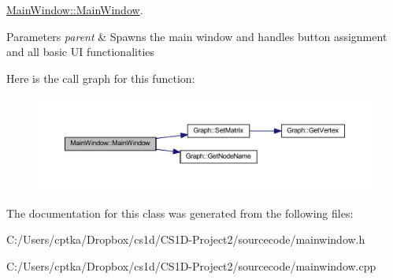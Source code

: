 \mbox{\hyperlink{class_main_window_a8b244be8b7b7db1b08de2a2acb9409db}{Main\+Window\+::\+Main\+Window}}. 


\begin{DoxyParams}{Parameters}
{\em parent} & Spawns the main window and handles button assignment and all basic UI functionalities \\
\hline
\end{DoxyParams}
Here is the call graph for this function\+:
\nopagebreak
\begin{figure}[H]
\begin{center}
\leavevmode
\includegraphics[width=350pt]{class_main_window_a8b244be8b7b7db1b08de2a2acb9409db_cgraph}
\end{center}
\end{figure}


The documentation for this class was generated from the following files\+:\begin{DoxyCompactItemize}
\item 
C\+:/\+Users/cptka/\+Dropbox/cs1d/\+C\+S1\+D-\/\+Project2/sourcecode/mainwindow.\+h\item 
C\+:/\+Users/cptka/\+Dropbox/cs1d/\+C\+S1\+D-\/\+Project2/sourcecode/mainwindow.\+cpp\end{DoxyCompactItemize}
